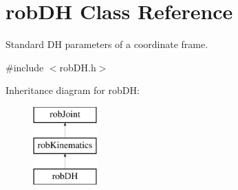 \hypertarget{classrob_d_h}{}\section{rob\+D\+H Class Reference}
\label{classrob_d_h}


Standard D\+H parameters of a coordinate frame.  




{\ttfamily \#include $<$rob\+D\+H.\+h$>$}

Inheritance diagram for rob\+D\+H\+:\begin{figure}[H]
\begin{center}
\leavevmode
\includegraphics[height=3.000000cm]{d3/d51/classrob_d_h}
\end{center}
\end{figure}
